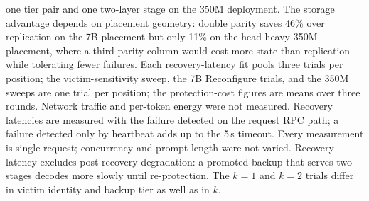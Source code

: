 one tier pair and one two-layer stage on the 350M deployment.  The storage
advantage depends on placement geometry: double parity saves 46\% over
replication on the 7B placement but only 11\% on the head-heavy 350M
placement, where a third parity column would cost more state than
replication while tolerating fewer failures.  Each recovery-latency fit
pools three trials per position; the victim-sensitivity sweep, the 7B Reconfigure trials, and the 350M
sweeps are one trial per position; the protection-cost figures are means over
three rounds.  Network traffic and per-token energy were not measured.
Recovery latencies are measured with the failure detected on the request
RPC path; a failure detected only by heartbeat adds up to the 5\,s timeout.  Every
measurement is single-request; concurrency and prompt length were not
varied.  Recovery latency excludes post-recovery degradation: a promoted
backup that serves two stages decodes more slowly until re-protection.  The
$k=1$ and $k=2$ trials differ in victim identity and backup tier as well as
in $k$.

